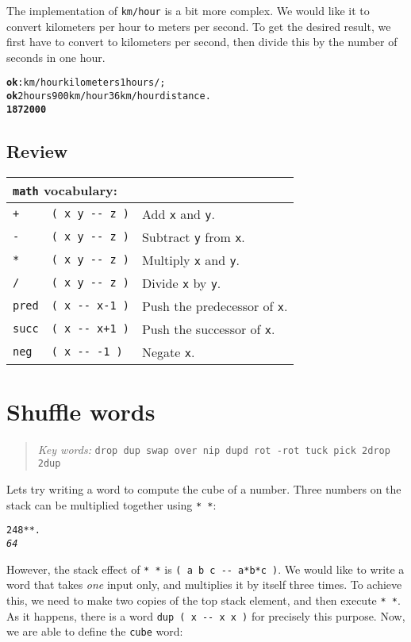 \documentclass[english]{book}
\newcommand{\chapkeywords}[1]{%
\begin{quote}
\emph{Key words:} \texttt{#1}
\end{quote}
}
\newcommand{\wordtable}[1]{{
\begin{tabularx}{12cm}{|l l X|}
#1
\hline
\end{tabularx}}}
\newcommand{\tabvocab}[1]{
\hline
\multicolumn{3}{|l|}{
\rule[-2mm]{0mm}{6mm}
\texttt{#1} vocabulary:}
\\
\hline
}
\begin{document}
The implementation of \texttt{km/hour} is a bit more complex. We would like it to convert kilometers per hour to meters per second. To get the desired result, we first have to convert to kilometers per second, then divide this by the number of seconds in one hour.

\begin{alltt}
\textbf{ok} : km/hour kilometers 1 hours / ;
\textbf{ok} 2 hours 900 km/hour 36 km/hour distance .
\textbf{1872000}
\end{alltt}

\subsection*{Review}

\wordtable{
\tabvocab{math}
\texttt{+}&
\texttt{( x y -{}- z )}&
Add \texttt{x} and \texttt{y}.\\
\texttt{-}&
\texttt{( x y -{}- z )}&
Subtract \texttt{y} from \texttt{x}.\\
\texttt{*}&
\texttt{( x y -{}- z )}&
Multiply \texttt{x} and \texttt{y}.\\
\texttt{/}&
\texttt{( x y -{}- z )}&
Divide \texttt{x} by \texttt{y}.\\
\texttt{pred}&
\texttt{( x -{}- x-1 )}&
Push the predecessor of \texttt{x}.\\
\texttt{succ}&
\texttt{( x -{}- x+1 )}&
Push the successor of \texttt{x}.\\
\texttt{neg}&
\texttt{( x -{}- -1 )}&
Negate \texttt{x}.\\
}

\section{Shuffle words}

\chapkeywords{drop dup swap over nip dupd rot -rot tuck pick 2drop 2dup}

Lets try writing a word to compute the cube of a number. 
Three numbers on the stack can be multiplied together using \texttt{{*}
{*}}:

\begin{alltt}
2 4 8 {*} {*} .
\emph{64}
\end{alltt}

However, the stack effect of \texttt{{*} {*}} is \texttt{( a b c -{}-
a{*}b{*}c )}. We would like to write a word that takes \emph{one} input
only, and multiplies it by itself three times. To achieve this, we need to make two copies of the top stack element, and then execute \texttt{{*} {*}}. As it happens, there is a word \texttt{dup ( x -{}-
x x )} for precisely this purpose. Now, we are able to define the
\texttt{cube} word:
\end{document}
